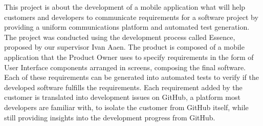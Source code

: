 This project is about the development of a mobile application what will help customers and developers to communicate requirements for a software project by providing a uniform communications platform and automated test generation.
The project was conducted using the development process called Essence, proposed by our supervisor Ivan Aaen.
The product is composed of a mobile application that the Product Owner uses to specify requirements in the form of User Interface components arranged in screens, composing the final software.
Each of these requirements can be generated into automated tests to verify if the developed software fulfills the requirements.
Each requirement added by the customer is translated into development issues on GitHub, a platform most developers are familiar with, to isolate the customer from GitHub itself, while still providing insights into the development progress from GitHub.

